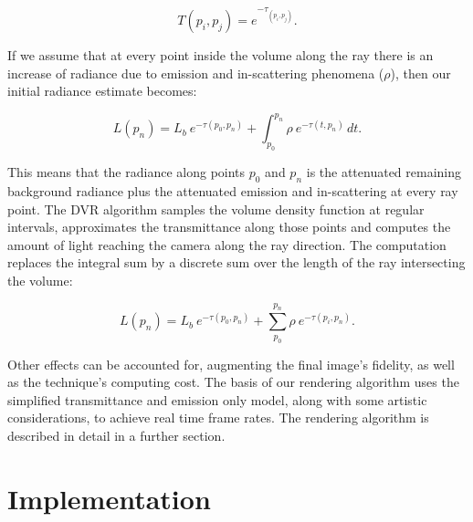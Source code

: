 \begin{equation} \label{eq:transmittance}  
  T(p_i,p_j) = e^{- \textstyle \tau_{(p_i, p_j)}}.
\end{equation}

If we assume that at every point inside the volume along the ray there is an increase of radiance due to emission and in-scattering phenomena ($\rho$), then our initial radiance estimate becomes:

\begin{equation} \label{eq:ray_radiance}  
  L(p_n) = L_b \ e^{-\tau(p_0, p_n)} + \int_{p_0}^{p_n} \rho \ e^{-\tau(t,p_n)} \, dt.
\end{equation}


This means that the radiance along points $p_0$ and $p_n$ is the attenuated remaining background radiance plus the attenuated emission and in-scattering at every ray point.
The DVR algorithm samples the volume density function at regular intervals, approximates the transmittance along those points and computes the amount of light reaching the camera along the ray direction.
The computation replaces the integral sum by a discrete sum over the length of the ray intersecting the volume:

\begin{equation} \label{eq:ray_radiance}  
  L(p_n) = L_b \ e^{-\tau(p_0, p_n)} + \sum_{p_0}^{p_n} \rho \ e^{-\tau(p_i,p_n)}.
\end{equation}

Other effects can be accounted for, augmenting the final image's fidelity, as well as the technique's computing cost. 
The basis of our rendering algorithm uses the simplified transmittance and emission only model, along with some artistic considerations, to achieve real time frame rates.
The rendering algorithm is described in detail in a further section. 

\section{Implementation}


